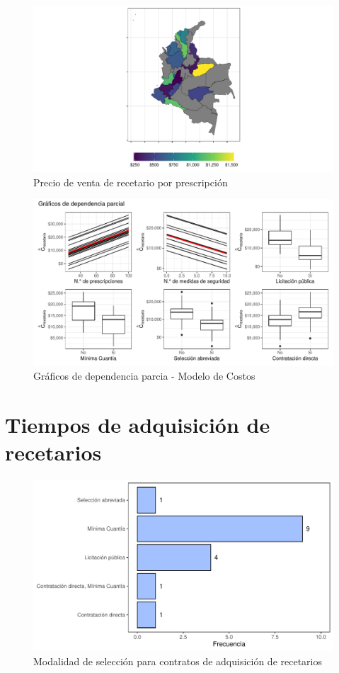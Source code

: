 \documentclass[
]{book}
\begin{document}
\begin{figure}
\includegraphics[width=0.9\linewidth]{InformeFinal_files/figure-latex/PVTA-Recetarios-1} \caption{Precio de venta de recetario por prescripción}\label{fig:PVTA-Recetarios}
\end{figure}

\begin{figure}
\includegraphics[width=0.9\linewidth]{InformeFinal_files/figure-latex/DependParcial1-1} \caption{Gráficos de dependencia parcia - Modelo de Costos}\label{fig:DependParcial1}
\end{figure}

\hypertarget{tiempos-de-adquisiciuxf3n-de-recetarios}{%
\section{Tiempos de adquisición de recetarios}\label{tiempos-de-adquisiciuxf3n-de-recetarios}}

\begin{figure}
\includegraphics[width=0.85\linewidth]{InformeFinal_files/figure-latex/modalidadAdquisicion-1} \caption{Modalidad de selección para contratos de adquisición de recetarios}\label{fig:modalidadAdquisicion}
\end{figure}
\end{document}
